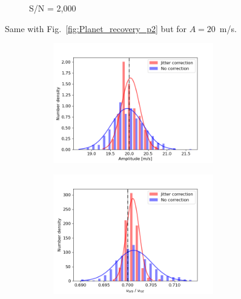 \begin{figure}[tbp]
\begin{subfigure}[b]{1.0\textwidth}
\begin{subfigure}[b]{0.49\textwidth}
        	\end{subfigure}
        	\caption{S/N = 2,000}
    \end{subfigure}	       
    \caption[Planet recovery ($A = 20$~m/s)]
    {Same with Fig.~\ref{fig:Planet_recovery_p2} but for $A = 20$~m/s.}
\label{fig:Planet_recovery_p20}
\end{figure}    


\begin{figure}[tbp]	
    \begin{subfigure}[b]{1.0\textwidth}
    		\begin{subfigure}[b]{0.49\textwidth}
        		\includegraphics[width=\textwidth]{./Figures/Methods/Histogram_new1_p20_sn10000.png}
        \end{subfigure}
        \begin{subfigure}[b]{0.49\textwidth}
        		\includegraphics[width=\textwidth]{./Figures/Methods/Histogram_new2_p20_sn10000.png}

\end{subfigure}
\end{subfigure}
\end{figure}
